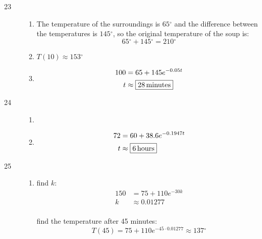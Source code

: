 \documentclass{exam}
\newcommand{\degree}{\ensuremath{^\circ}}
\begin{document}
\begin{description}
      \item[23]
        \begin{enumerate}[a]
          \item The temperature of the surroundings is $65 \degree$ and the difference between the temperatures is
            $145 \degree$, so the original temperature of the soup is:
            \[
              65 \degree + 145 \degree = \boxed{210 \degree}
            \]

          \item $T(10) \approx \boxed{153 \degree}$

          \item 
            \begin{align*}
              100 & = 65 + 145 e^{-0.05t} \\
              t   & \approx \boxed{\unit[28]{minutes}} \\
            \end{align*}
        \end{enumerate}

      \item[24]
        \begin{enumerate}[a]
          \item {}
            
          \item 
            \begin{align*}
              72 & = 60 + 38.6 e^{-0.1947 t} \\
              t  & \approx \boxed{\unit[6]{hours}} \\
            \end{align*}
        \end{enumerate}

      \pagebreak

      \item[25]
        \begin{enumerate}[a]
          \item find $k$:
            \begin{align*}
              150 & = 75 + 110 e^{-30k} \\
              k   & \approx 0.01277 \\
            \end{align*}

            find the temperature after 45 minutes:
            \[
              T(45) = 75 + 110 e^{-45 \cdot 0.01277} \approx \boxed{137 \degree}
            \]


\end{enumerate}
\end{description}
\end{document}
